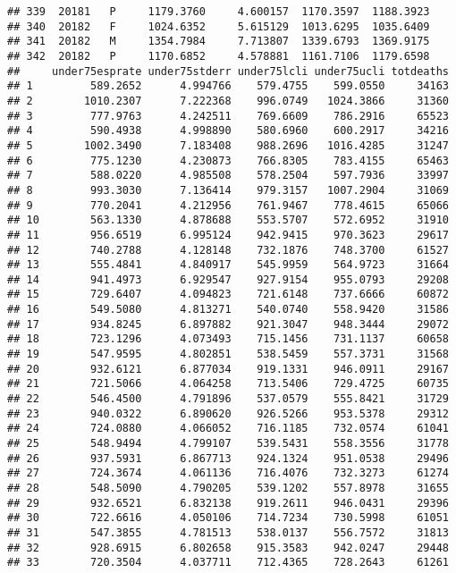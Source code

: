 \documentclass[]{article}
\begin{document}
\begin{verbatim}
## 339  20181   P     1179.3760     4.600157  1170.3597  1188.3923
## 340  20182   F     1024.6352     5.615129  1013.6295  1035.6409
## 341  20182   M     1354.7984     7.713807  1339.6793  1369.9175
## 342  20182   P     1170.6852     4.578881  1161.7106  1179.6598
##     under75esprate under75stderr under75lcli under75ucli totdeaths
## 1         589.2652      4.994766    579.4755    599.0550     34163
## 2        1010.2307      7.222368    996.0749   1024.3866     31360
## 3         777.9763      4.242511    769.6609    786.2916     65523
## 4         590.4938      4.998890    580.6960    600.2917     34216
## 5        1002.3490      7.183408    988.2696   1016.4285     31247
## 6         775.1230      4.230873    766.8305    783.4155     65463
## 7         588.0220      4.985508    578.2504    597.7936     33997
## 8         993.3030      7.136414    979.3157   1007.2904     31069
## 9         770.2041      4.212956    761.9467    778.4615     65066
## 10        563.1330      4.878688    553.5707    572.6952     31910
## 11        956.6519      6.995124    942.9415    970.3623     29617
## 12        740.2788      4.128148    732.1876    748.3700     61527
## 13        555.4841      4.840917    545.9959    564.9723     31664
## 14        941.4973      6.929547    927.9154    955.0793     29208
## 15        729.6407      4.094823    721.6148    737.6666     60872
## 16        549.5080      4.813271    540.0740    558.9420     31586
## 17        934.8245      6.897882    921.3047    948.3444     29072
## 18        723.1296      4.073493    715.1456    731.1137     60658
## 19        547.9595      4.802851    538.5459    557.3731     31568
## 20        932.6121      6.877034    919.1331    946.0911     29167
## 21        721.5066      4.064258    713.5406    729.4725     60735
## 22        546.4500      4.791896    537.0579    555.8421     31729
## 23        940.0322      6.890620    926.5266    953.5378     29312
## 24        724.0880      4.066052    716.1185    732.0574     61041
## 25        548.9494      4.799107    539.5431    558.3556     31778
## 26        937.5931      6.867713    924.1324    951.0538     29496
## 27        724.3674      4.061136    716.4076    732.3273     61274
## 28        548.5090      4.790205    539.1202    557.8978     31655
## 29        932.6521      6.832138    919.2611    946.0431     29396
## 30        722.6616      4.050106    714.7234    730.5998     61051
## 31        547.3855      4.781513    538.0137    556.7572     31813
## 32        928.6915      6.802658    915.3583    942.0247     29448
## 33        720.3504      4.037711    712.4365    728.2643     61261

\end{verbatim}
\end{document}

